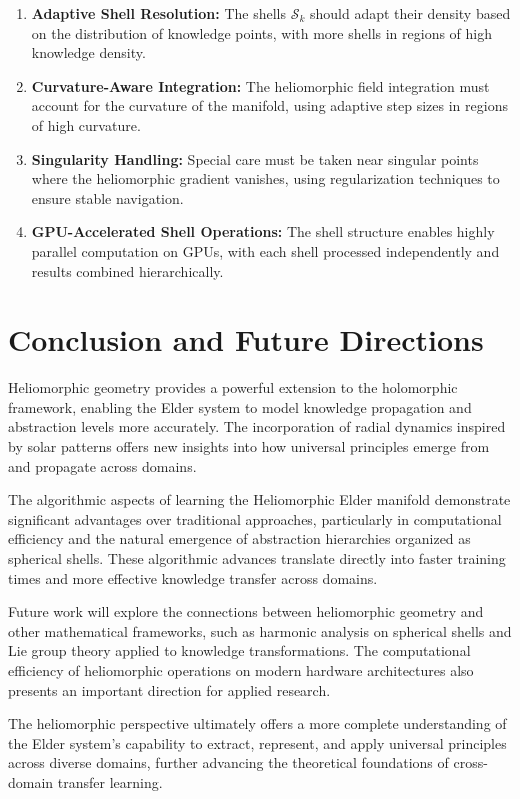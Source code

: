 \begin{enumerate}
    \item \textbf{Adaptive Shell Resolution:} The shells $\mathcal{S}_k$ should adapt their density based on the distribution of knowledge points, with more shells in regions of high knowledge density.
    
    \item \textbf{Curvature-Aware Integration:} The heliomorphic field integration must account for the curvature of the manifold, using adaptive step sizes in regions of high curvature.
    
    \item \textbf{Singularity Handling:} Special care must be taken near singular points where the heliomorphic gradient vanishes, using regularization techniques to ensure stable navigation.
    
    \item \textbf{GPU-Accelerated Shell Operations:} The shell structure enables highly parallel computation on GPUs, with each shell processed independently and results combined hierarchically.
\end{enumerate}

\section{Conclusion and Future Directions}

Heliomorphic geometry provides a powerful extension to the holomorphic framework, enabling the Elder system to model knowledge propagation and abstraction levels more accurately. The incorporation of radial dynamics inspired by solar patterns offers new insights into how universal principles emerge from and propagate across domains.

The algorithmic aspects of learning the Heliomorphic Elder manifold demonstrate significant advantages over traditional approaches, particularly in computational efficiency and the natural emergence of abstraction hierarchies organized as spherical shells. These algorithmic advances translate directly into faster training times and more effective knowledge transfer across domains.

Future work will explore the connections between heliomorphic geometry and other mathematical frameworks, such as harmonic analysis on spherical shells and Lie group theory applied to knowledge transformations. The computational efficiency of heliomorphic operations on modern hardware architectures also presents an important direction for applied research.

The heliomorphic perspective ultimately offers a more complete understanding of the Elder system's capability to extract, represent, and apply universal principles across diverse domains, further advancing the theoretical foundations of cross-domain transfer learning.